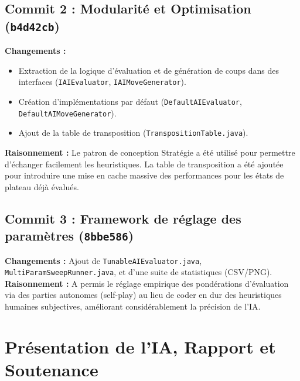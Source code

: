 \documentclass[12pt, a4paper]{article}
\begin{document}
\subsection{Commit 2 : Modularité et Optimisation (\texttt{b4d42cb})}
\begin{commitbox}
\textbf{Changements :}
\begin{itemize}
    \item Extraction de la logique d'évaluation et de génération de coups dans des interfaces (\texttt{IAIEvaluator}, \texttt{IAIMoveGenerator}).
    \item Création d'implémentations par défaut (\texttt{DefaultAIEvaluator}, \texttt{DefaultAIMoveGenerator}).
    \item Ajout de la table de transposition (\texttt{TranspositionTable.java}).
\end{itemize}
\textbf{Raisonnement :} Le patron de conception Stratégie a été utilisé pour permettre d'échanger facilement les heuristiques. La table de transposition a été ajoutée pour introduire une mise en cache massive des performances pour les états de plateau déjà évalués.
\end{commitbox}

\subsection{Commit 3 : Framework de réglage des paramètres (\texttt{8bbe586})}
\begin{commitbox}
\textbf{Changements :} Ajout de \texttt{TunableAIEvaluator.java}, \texttt{MultiParamSweepRunner.java}, et d'une suite de statistiques (CSV/PNG).\\
\textbf{Raisonnement :} A permis le réglage empirique des pondérations d'évaluation via des parties autonomes (self-play) au lieu de coder en dur des heuristiques humaines subjectives, améliorant considérablement la précision de l'IA.
\end{commitbox}

\section{Présentation de l'IA, Rapport et Soutenance}
\end{document}
